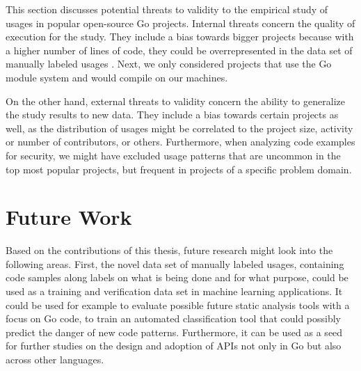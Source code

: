 This section discusses potential threats to validity to the empirical study of \unsafe{} usages in popular open-source
Go projects.
Internal threats concern the quality of execution for the study.
They include a bias towards bigger projects because with a higher number of lines of code, they could be
overrepresented in the data set of manually labeled \unsafe{} usages .
Next, we only considered projects that use the Go module system and would compile on our machines.

On the other hand, external threats to validity concern the ability to generalize the study results to new data.
They include a bias towards certain projects as well, as the distribution of \unsafe{} usages might be correlated to the
project size, activity or number of contributors, or others.
Furthermore, when analyzing \unsafe{} code examples for security, we might have excluded usage patterns that are
uncommon in the top \projsTotal{} most popular projects, but frequent in projects of a specific problem domain.



\section{Future Work}\label{sec:discussion:future-work}

Based on the contributions of this thesis, future research might look into the following areas.
First, the novel data set of manually labeled \unsafe{} usages, containing code samples along labels on what is being
done and for what purpose, could be used as a training and verification data set in machine learning applications.
It could be used for example to evaluate possible future static analysis tools with a focus on \unsafe{} Go code,
to train an automated classification tool that could possibly predict the danger of new \unsafe{} code patterns.
Furthermore, it can be used as a seed for further studies on the design and adoption of \unsafe{} APIs not only in Go
but also across other languages.


